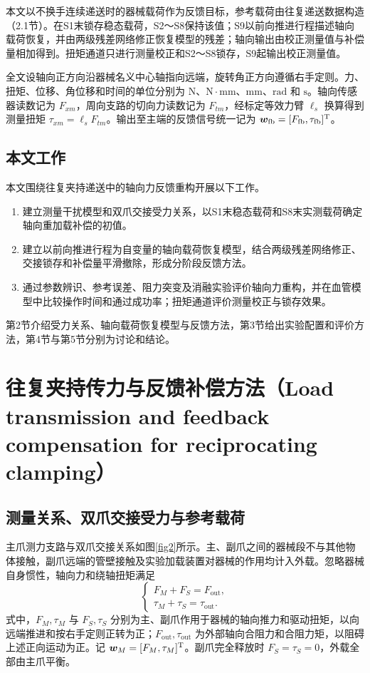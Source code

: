 \documentclass{JQRnew}
\providecommand{\RevisionColor}{\color{black}}
\newcommand{\revbegin}{\begingroup\RevisionColor}
\newcommand{\revend}{\par\endgroup}
\begin{document}
本文以不换手连续递送时的器械载荷作为反馈目标，参考载荷由往复递送数据构造（2.1节）。在S1末锁存稳态载荷，S2～S8保持该值；S9以前向推进行程描述轴向载荷恢复，并由两级残差网络修正恢复模型的残差；轴向输出由校正测量值与补偿量相加得到。扭矩通道只进行测量校正和S2～S8锁存，S9起输出校正测量值。

\revbegin
全文设轴向正方向沿器械名义中心轴指向远端，旋转角正方向遵循右手定则。力、扭矩、位移、角位移和时间的单位分别为 $\mathrm{N}$、$\mathrm{N}\cdot\mathrm{mm}$、$\mathrm{mm}$、$\mathrm{rad}$ 和 $\mathrm{s}$。轴向传感器读数记为 $F_{xm}$，周向支路的切向力读数记为 $F_{tm}$，经标定等效力臂 $\ell_s$ 换算得到测量扭矩 $\tau_{xm}=\ell_sF_{tm}$。输出至主端的反馈信号统一记为 $\bm w_{\mathrm{fb}}=[F_{\mathrm{fb}},\tau_{\mathrm{fb}}]^{\rm T}$。
\revend

\subsection{本文工作}

本文围绕往复夹持递送中的轴向力反馈重构开展以下工作。
\begin{enumerate}[label=\arabic*),nosep,itemsep=0pt,topsep=2pt,partopsep=0pt,parsep=0pt,leftmargin=2\ccwd]
\item 建立测量干扰模型和双爪交接受力关系，以S1末稳态载荷和S8末实测载荷确定轴向重加载补偿的初值。
\item 建立以前向推进行程为自变量的轴向载荷恢复模型，结合两级残差网络修正、交接锁存和补偿量平滑撤除，形成分阶段反馈方法。
\item 通过参数辨识、参考误差、阻力突变及消融实验评价轴向力重构，并在血管模型中比较操作时间和通过成功率；扭矩通道评价测量校正与锁存效果。
\end{enumerate}

\revbegin
第2节介绍受力关系、轴向载荷恢复模型与反馈方法，第3节给出实验配置和评价方法，第4节与第5节分别为讨论和结论。
\revend

\section{往复夹持传力与反馈补偿方法（Load transmission and feedback compensation for reciprocating clamping）}

\subsection{测量关系、双爪交接受力与参考载荷}

主爪测力支路与双爪交接关系如图\ref{fig2}所示。主、副爪之间的器械段不与其他物体接触，副爪远端的管壁接触及实验加载装置对器械的作用均计入外载。忽略器械自身惯性，轴向力和绕轴扭矩满足
\begin{equation}
\label{eq:balance}
\begin{cases}
F_M+F_S=F_{\mathrm{out}},\\
\tau_M+\tau_S=\tau_{\mathrm{out}}.
\end{cases}
\end{equation}
式中，$F_M,\tau_M$ 与 $F_S,\tau_S$ 分别为主、副爪作用于器械的轴向推力和驱动扭矩，以向远端推进和按右手定则正转为正；$F_{\mathrm{out}},\tau_{\mathrm{out}}$ 为外部轴向合阻力和合阻力矩，以阻碍上述正向运动为正。记 $\bm w_M=[F_M,\tau_M]^{\rm T}$。副爪完全释放时 $F_S=\tau_S=0$，外载全部由主爪平衡。
\end{document}
